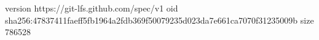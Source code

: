 version https://git-lfs.github.com/spec/v1
oid sha256:47837411faeff5fb1964a2fdb369f50079235d023da7e661ca7070f31235009b
size 786528
